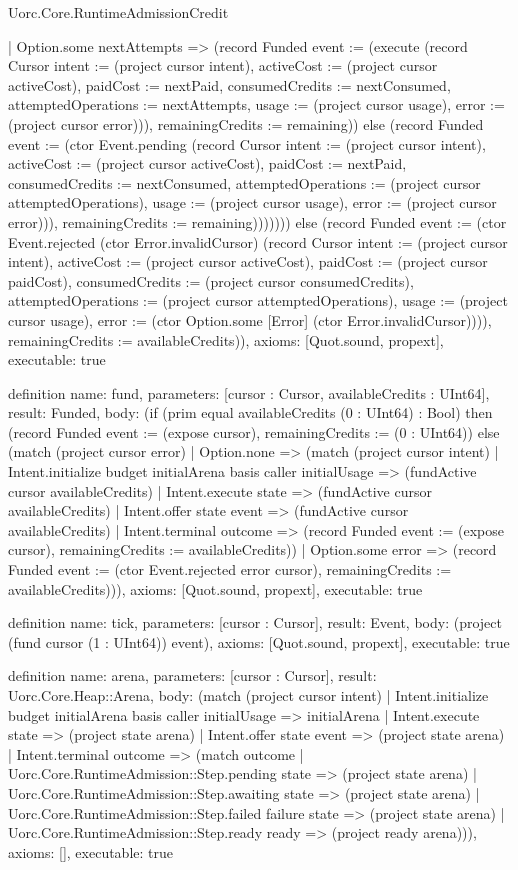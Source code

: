 \begin{lexlean}{Uorc.Core.RuntimeAdmissionCredit}
\begin{semanticmodule}
{        | Option.some nextAttempts => (record Funded {event := (execute (record Cursor {intent := (project cursor intent), activeCost := (project cursor activeCost), paidCost := nextPaid, consumedCredits := nextConsumed, attemptedOperations := nextAttempts, usage := (project cursor usage), error := (project cursor error)})), remainingCredits := remaining})) else (record Funded {event := (ctor Event.pending (record Cursor {intent := (project cursor intent), activeCost := (project cursor activeCost), paidCost := nextPaid, consumedCredits := nextConsumed, attemptedOperations := (project cursor attemptedOperations), usage := (project cursor usage), error := (project cursor error)})), remainingCredits := remaining}))))))) else (record Funded {event := (ctor Event.rejected (ctor Error.invalidCursor) (record Cursor {intent := (project cursor intent), activeCost := (project cursor activeCost), paidCost := (project cursor paidCost), consumedCredits := (project cursor consumedCredits), attemptedOperations := (project cursor attemptedOperations), usage := (project cursor usage), error := (ctor Option.some [Error] (ctor Error.invalidCursor))})), remainingCredits := availableCredits})),
  axioms: [Quot.sound, propext],
  executable: true
}

definition{
  name: fund,
  parameters: [cursor : Cursor, availableCredits : UInt64],
  result: Funded,
  body: (if (prim equal availableCredits (0 : UInt64) : Bool) then (record Funded {event := (expose cursor), remainingCredits := (0 : UInt64)}) else (match (project cursor error)
    | Option.none => (match (project cursor intent)
      | Intent.initialize budget initialArena basis caller initialUsage => (fundActive cursor availableCredits)
      | Intent.execute state => (fundActive cursor availableCredits)
      | Intent.offer state event => (fundActive cursor availableCredits)
      | Intent.terminal outcome => (record Funded {event := (expose cursor), remainingCredits := availableCredits}))
    | Option.some error => (record Funded {event := (ctor Event.rejected error cursor), remainingCredits := availableCredits}))),
  axioms: [Quot.sound, propext],
  executable: true
}

definition{
  name: tick,
  parameters: [cursor : Cursor],
  result: Event,
  body: (project (fund cursor (1 : UInt64)) event),
  axioms: [Quot.sound, propext],
  executable: true
}

definition{
  name: arena,
  parameters: [cursor : Cursor],
  result: Uorc.Core.Heap::Arena,
  body: (match (project cursor intent)
    | Intent.initialize budget initialArena basis caller initialUsage => initialArena
    | Intent.execute state => (project state arena)
    | Intent.offer state event => (project state arena)
    | Intent.terminal outcome => (match outcome
      | Uorc.Core.RuntimeAdmission::Step.pending state => (project state arena)
      | Uorc.Core.RuntimeAdmission::Step.awaiting state => (project state arena)
      | Uorc.Core.RuntimeAdmission::Step.failed failure state => (project state arena)
      | Uorc.Core.RuntimeAdmission::Step.ready ready => (project ready arena))),
  axioms: [],
  executable: true
}


\end{semanticmodule}
\end{lexlean}
